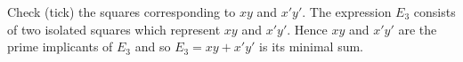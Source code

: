 \documentclass[../main-sheet.tex]{subfiles}
\begin{document}
\begin{soln}
\begin{enumerate}[label=(\alph*)]
\begin{center}
        \end{center}
        Check (tick) the squares corresponding to $ x y $ and $ x' y' $. The expression $ E_3 $ consists of two isolated squares which represent $ x y $ and $ x' y' $. Hence $ x y $ and $ x ' y' $ are the prime implicants of $ E_3 $ and so $ E_3 = x y + x' y' $ is its minimal sum.
    \end{enumerate}
\end{soln}
\end{document}
